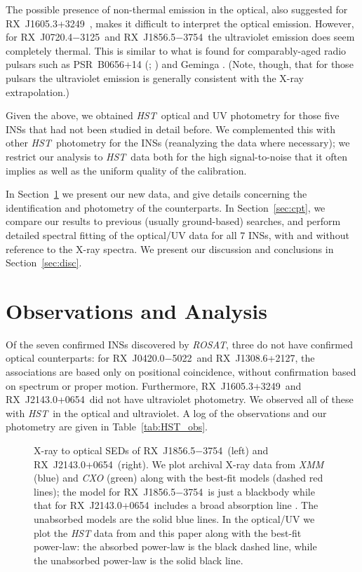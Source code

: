 \documentclass[iop]{emulateapj}
\newcommand{\rxjw}{RX~J1856.5$-$3754}
\newcommand{\rxjk}{RX~J0720.4$-$3125}
\newcommand{\rbs}{RX~J1308.6+2127}
\newcommand{\rbsb}{RX~J2143.0+0654}
\newcommand{\rxjvk}{RX~J1605.3+3249}
\newcommand{\rxjb}{RX~J0420.0$-$5022}
\newcommand{\hst}{{\em HST}}
\begin{document}
The possible presence of non-thermal emission in the optical, also
suggested for \rxjvk\ \citep{msh+05,zdlmt06}, makes it difficult to
interpret the optical emission.  However, for \rxjk\ and \rxjw\ the
ultraviolet emission does seem completely thermal.  This is similar to
what is found for comparably-aged radio pulsars such as PSR~B0656+14
(\citealt*{pwc97}; \citealt{ssl+05}) and Geminga \citep{kpzr05}.
(Note, though, that for those pulsars the ultraviolet emission is
generally consistent with the X-ray extrapolation.)

Given the above, we obtained \hst\ optical and UV photometry for those
five INSs that had not been studied in detail before.  We complemented
this with other \hst\ photometry for the INSs (reanalyzing the data
where necessary); we restrict our analysis to \hst\ data both for the
high signal-to-noise that it often implies as well as the uniform
quality of the calibration.

In Section~\ref{sec:obs} we present our new data, and give details
concerning the identification and photometry of the
counterparts.  In Section~\ref{sec:cpt}, we compare our results to
previous (usually ground-based) searches, and perform detailed
spectral fitting of the optical/UV data for all 7 INSs, with and
without reference to the X-ray spectra.  We present our discussion and
conclusions in Section~\ref{sec:disc}.



\section{Observations and Analysis}
\label{sec:obs}
Of the seven confirmed INSs discovered by \textit{ROSAT}, three do not
have confirmed optical counterparts: for \rxjb\ and \rbs, the
associations are based only on positional coincidence, without
confirmation based on spectrum or proper motion.  Furthermore, \rxjvk\
and \rbsb\ did not have ultraviolet photometry.  We observed all of
these with \hst\ in the optical and ultraviolet.  A log of the
observations and our photometry are given in Table~\ref{tab:HST_obs}.


\begin{figure}
\caption{X-ray to optical SEDs of \rxjw\ (left) and \rbsb\ (right). We
plot archival X-ray data from \textit{XMM} (blue) and \textit{CXO}
(green) along with the best-fit models (dashed red lines); the model
for \rxjw\ is just a blackbody \citep{bhn+03} while that for
\rbsb\ includes a broad absorption line \citep{kvk09}.  The unabsorbed
models are the solid blue lines.  In the optical/UV we plot the
\textit{HST} data from \citet{vkk01} and this paper along with the
best-fit power-law: the absorbed power-law is the black dashed line,
while the unabsorbed power-law is the solid black line.}
\label{fig:ox}
\end{figure}
\end{document}
